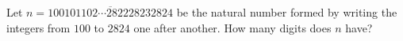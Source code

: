 Let $n=\overline{100101102\cdots282228232824}$ be the natural number formed by writing the integers from $100$ to $2824$ one after another. How many digits does $n$ have?
